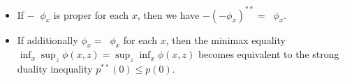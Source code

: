 \documentclass{article}
\DeclareMathOperator{\ccvcl}{\hat{cl}}
\begin{document}
\begin{itemize}
\item If $-\ccvcl \phi_x$ is proper for each $x$, then we have $-(-\phi_x)^{**} = \ccvcl \phi_x$.
\item If additionally $\phi_x = \ccvcl \phi_x$ for each $x$, then
  the minimax equality $\inf_x \sup_z \phi(x, z) = \sup_z \inf_x \phi(x, z)$ becomes equivalent to the strong duality inequality $p^{**}(0) \le p(0)$.
\end{itemize}

\printbibliography
\end{document}
